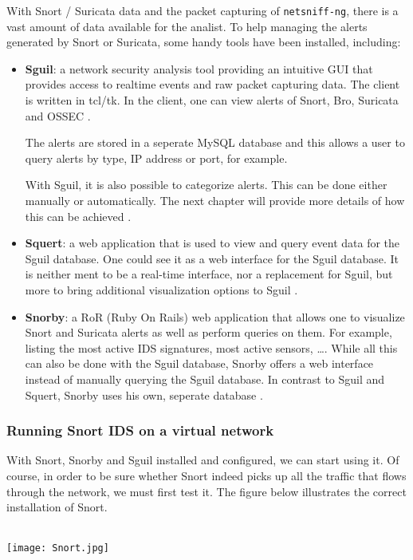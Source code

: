 With Snort / Suricata data and the packet capturing of \texttt{netsniff-ng}, there is a vast amount of data available for the analist. To help managing the alerts generated by Snort or Suricata, some handy tools have been installed, including:

\begin{itemize}
\item \textbf{Sguil}: a network security analysis tool providing an intuitive GUI that provides access to realtime events and raw packet capturing data. The client is written in tcl/tk. In the client, one can view alerts of Snort, Bro, Suricata and OSSEC \citep{Sguil}.

The alerts are stored in a seperate MySQL database and this allows a user to query alerts by type, IP address or port, for example.

With Sguil, it is also possible to categorize alerts. This can be done either manually or automatically. The next chapter will provide more details of how this can be achieved \citep{Sguil}.

\item \textbf{Squert}: a web application that is used to view and query event data for the Sguil database. One could see it as a web interface for the Sguil database. It is neither ment to be a real-time interface, nor a replacement for Sguil, but more to bring additional visualization options to Sguil \citep{Squert}.

\item \textbf{Snorby}: a RoR (Ruby On Rails) web application that allows one to visualize Snort and Suricata alerts as well as perform queries on them. For example, listing the most active IDS signatures, most active sensors, \ldots. While all this can also be done with the Sguil database, Snorby offers a web interface instead of manually querying the Sguil database. In contrast to Sguil and Squert, Snorby uses his own, seperate database \citep{Snorby}.
\end{itemize}

\subsubsection{Running Snort IDS on a virtual network}

With Snort, Snorby and Sguil installed and configured, we can start using it. Of course, in order to be sure whether Snort indeed picks up all the traffic that flows through the network, we must first test it. The figure below illustrates the correct installation of Snort.
$\;$ \\ \\
\noindent\begin{minipage}{\textwidth}
    \centering
    \texttt{[image: Snort.jpg]}
\label{fig:network}
\end{minipage}


